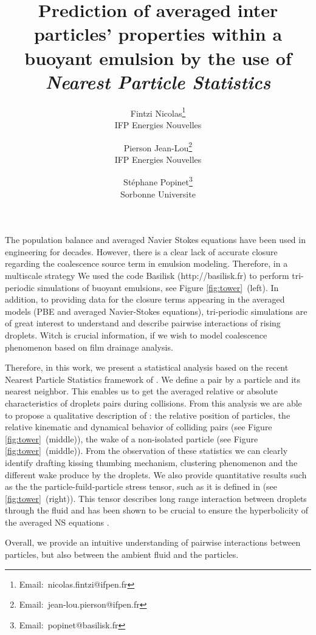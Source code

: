 \documentclass{icnmmf5}
\title{Prediction of averaged inter particles' properties within a buoyant emulsion by the use of \textit{Nearest Particle Statistics}}
\author{Fintzi Nicolas\thanks{Email:~nicolas.fintzi@ifpen.fr}\\IFP Energies Nouvelles\and
Pierson Jean-Lou\thanks{Email:~jean-lou.pierson@ifpen.fr}\\IFP Energies Nouvelles
\and
Stéphane Popinet\thanks{Email:~popinet@basilisk.fr}\\Sorbonne Universite}
\date{}
\begin{document}
\maketitle

The population balance and averaged Navier Stokes equations have been used in engineering for decades. 
However, there is a clear lack of accurate closure regarding the coalescence source term in emulsion modeling.  
Therefore, in a multiscale strategy 
We used the code Basilisk ({http://basilisk.fr}) to perform tri-periodic simulations of buoyant emulsions, see Figure \ref{fig:tower}~(left). 
In addition, to providing data for the closure terms appearing in the averaged models (PBE and averaged Navier-Stokes equations), tri-periodic simulations are of great interest to understand and describe pairwise interactions of rising droplets. Witch is crucial information, if we wish to model coalescence phenomenon based on film drainage analysis. 

Therefore, in this work, we present a statistical analysis based on the recent Nearest Particle Statistics framework of \cite{zhang2021ensemble}.
We define a pair by a particle and its nearest neighbor. 
This enables us to get the averaged relative or absolute characteristics of droplets pairs during collisions.
From this analysis we are able to propose a qualitative description of :
the relative position of particles, the relative kinematic and dynamical behavior of colliding pairs (see Figure \ref{fig:tower}~(middle)), the wake of a non-isolated particle (see Figure \ref{fig:tower}~(middle)).
From the observation of these statistics we can clearly identify drafting kissing thumbing mechanism, clustering phenomenon and the different wake produce by the droplets.   
We also provide quantitative results such as the
the particle-fuild-particle stress tensor, such as it is defined in \cite{zhang2021ensemble} (see \ref{fig:tower}~(right)). 
This tensor describes long range interaction between droplets through the fluid and has been shown to be crucial to ensure the hyperbolicity of the averaged NS equations \cite{fox2022hyperbolic}. 

Overall, we provide an intuitive understanding of pairwise interactions between particles, but also between the ambient fluid and the particles. 




\end{document}
